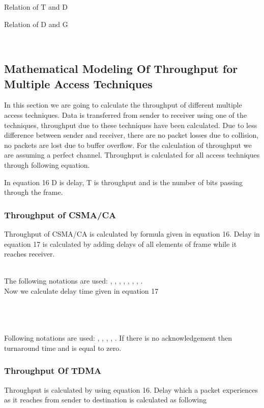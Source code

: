 \documentclass[10pt, conference, compsocconf]{IEEEtran}
\begin{document}
Relation of T and D

Relation of D and G

\\
\subsection{Mathematical Modeling Of Throughput for Multiple Access Techniques}
In this section we are going to calculate the throughput of different multiple access techniques. Data is transferred from sender to receiver using one of the techniques, throughput due to these techniques have been calculated. Due to less difference between sender and receiver, there are no packet losses due to collision, no packets are lost due to buffer overflow. For the calculation of throughput we are assuming a perfect channel. Throughput is calculated for all access techniques through following equation.


In equation 16 D is delay, T is throughput and  is the number of bits passing through the frame.
\subsubsection{Throughput of CSMA/CA}

Throughput of CSMA/CA is calculated by formula given in equation 16. Delay in equation 17 is calculated by adding delays of all elements of frame while it reaches receiver.


\\
The following notations are used:   ,   ,   ,   , ,   ,   ,   . \\
Now we calculate delay time given in equation 17

\\
   
\\
   
\\

Following notations are used:  ,  ,   ,   , .
\indent If there is no acknowledgement then turnaround time  and  is equal to zero.
\\
\subsubsection{Throughput Of TDMA}

Throughput is calculated by using equation 16. Delay which a packet experiences as it reaches from sender to destination is calculated as following
\end{document}
